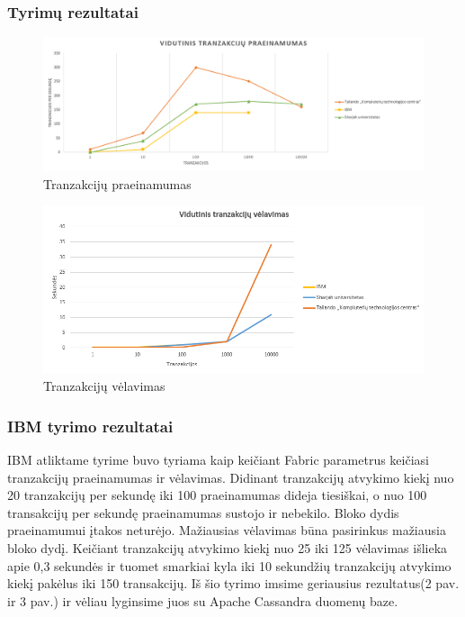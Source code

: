\documentclass{VUMIFPSkursinis}
\begin{document}
		\subsubsection{Tyrimų rezultatai}
			\begin{figure}[H]
			    \centering
			    \includegraphics[scale=0.6]{img/Praein}
			    \caption{Tranzakcijų praeinamumas}   %
			    \label{img:mlp}
			\end{figure}		
			\begin{figure}[H]
			    \centering
			    \includegraphics[scale=0.6]{img/Velav}
			    \caption{Tranzakcijų vėlavimas}   %
			    \label{img:mlp}
			\end{figure}		
		\subsubsection{IBM tyrimo rezultatai}
			IBM atliktame tyrime \cite{IMBResearch} buvo tyriama kaip keičiant Fabric parametrus keičiasi tranzakcijų praeinamumas ir vėlavimas. Didinant tranzakcijų atvykimo kiekį nuo 20 tranzakcijų per sekundę iki 100 praeinamumas dideja tiesiškai, o nuo 100 transakcijų per sekundę praeinamumas sustojo ir nebekilo. Bloko dydis praeinamumui įtakos neturėjo. 
			\newline
			Mažiausias vėlavimas būna pasirinkus mažiausia bloko dydį. Keičiant tranzakcijų atvykimo kiekį nuo 25 iki 125 vėlavimas išlieka apie 0,3 sekundės ir tuomet smarkiai kyla iki 10 sekundžių tranzakcijų 
			atvykimo kiekį pakėlus iki 150 transakcijų. 
			\newline
			Iš šio tyrimo imsime geriausius rezultatus(2 pav. ir 3 pav.) ir vėliau lyginsime juos su Apache Cassandra duomenų baze. 
\end{document}
